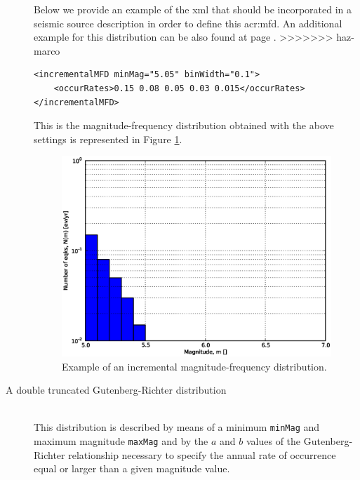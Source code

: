 \begin{description}
    Below we provide an example of the xml that should
    be incorporated in a seismic source description in order to define 
    this \gls{acr:mfd}. An additional example for this distribution can
    be also found at page \pageref{example_incremental_mfd}.
>>>>>>> haz-marco
\begin{Verbatim}[frame=single, commandchars=\\\{\}, fontsize=\footnotesize]
<incrementalMFD minMag="5.05" binWidth="0.1">
    <occurRates>0.15 0.08 0.05 0.03 0.015</occurRates>
</incrementalMFD>
\end{Verbatim}
    This is the magnitude-frequency distribution obtained with the above
    settings is represented in Figure \ref{fig:evenly_discretized_mfd}.
\begin{figure}[!ht]
\centering
\includegraphics[width=12cm]{./figures/hazard/ed_mfd.eps}
\caption{Example of an incremental magnitude-frequency distribution.}
\label{fig:evenly_discretized_mfd}
\end{figure}
%
\item[A double truncated Gutenberg-Richter distribution] \hfill \\
    This distribution is de\-scribed by means of a minimum \texttt{minMag}
    and maximum magnitude \texttt{maxMag} and by the $a$ and $b$ values 
    of the Gutenberg-Richter relationship necessary to specify the annual 
    rate of occurrence equal or larger than a given magnitude value. 
    

\end{description}
